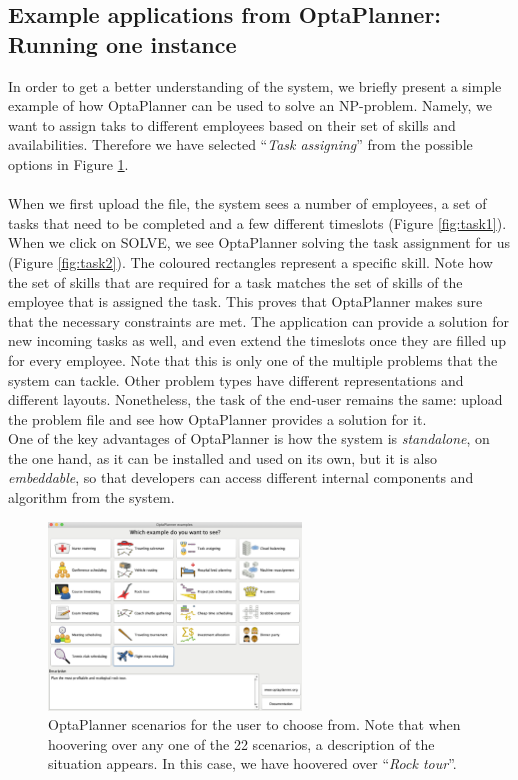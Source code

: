 \subsection{Example applications from OptaPlanner: Running one instance}
In order to get a better understanding of the system, we briefly present a simple example of how OptaPlanner can be used to solve an NP-problem. Namely, we want to assign taks to different employees based on their set of skills and availabilities.
Therefore we have selected ``\textit{Task assigning}'' from the possible options in Figure \ref{fig:OP_UI}. \\\\
When we first upload the file, the system sees a number of employees, a set of tasks that need to be completed and a few different timeslots (Figure \ref{fig:task1}). When we click on {\small\MakeUppercase{Solve}}, we see OptaPlanner solving the task assignment for us (Figure \ref{fig:task2}). The coloured rectangles represent a specific skill. Note how the set of skills that are required for a task matches the set of skills of the employee that is assigned the task. This proves that OptaPlanner makes sure that the necessary constraints are met.
\noindent The application can provide a solution for new incoming tasks as well, and even extend the timeslots once they are filled up for every employee. Note that this is only one of the multiple problems that the system can tackle. Other problem types have different representations and different layouts. Nonetheless, the task of the end-user remains the same: upload the problem file and see how OptaPlanner provides a solution for it. \\
One of the key advantages of OptaPlanner is how the system is \textit{standalone}, on the one hand, as it can be installed and used on its own, but it is also \textit{embeddable}, so that developers can access different internal components and algorithm from the system.
\begin{figure}[H]
    \centering  
    \includegraphics[width=0.6\textwidth]{figures/OPlannerUI.png}
    \caption{OptaPlanner scenarios for the user to choose from. Note that when hoovering over any one of the 22 scenarios, a description of the situation appears. In this case, we have hoovered over ``\textit{Rock tour}''.}
    \label{fig:OP_UI}
\end{figure}
